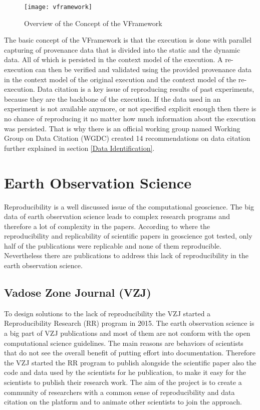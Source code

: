 \documentclass[draft,final]{vutinfth} %
\begin{document}
\begin{figure}[h]
	\centering
	\texttt{[image: vframework]}
	\caption{Overview of the Concept of the VFramework \cite{Miksa2013FrameworkFV}}
	\label{fig:vframework} %
\end{figure}

The basic concept of the VFramework is that the execution is done with parallel capturing of provenance data that is divided into the static and the dynamic data. All of which is persisted in the context model of the execution. A re-execution can then be verified and validated using the provided provenance data in the context model of the original execution and the context model of the re-execution.\cite{Miksa2013FrameworkFV}
Data citation is a key issue of reproducing results of past experiments, because they are the backbone of the execution. If the data used in an experiment is not available anymore, or not specified explicit enough then there is no chance of reproducing it no matter how much information about the execution was persisted. 
That is why there is an official working group named Working Group on Data Citation (WGDC) created 14 recommendations on data citation further explained in section \ref{Data Identification}.

\section{Earth Observation Science}\label{EOScience}

Reproducibility is a well discussed issue of the computational geoscience. The big data of earth observation science leads to complex research programs and therefore a lot of complexity in the papers.  According to \cite{Ostermann2017AdvancingSW} where the reproducibility and replicability of scientific papers in geoscience got tested, only half of the publications were replicable and none of them reproducible. Nevertheless there are publications to address this lack of reproducibility in the earth observation science. 

\subsection{Vadose Zone Journal (VZJ)}\label{VZJ}
To design solutions to the lack of reproducibility the VZJ started a Reproducibility Research (RR) program in 2015. \cite{doi:10.2136/vzj2015.06.0088}
The earth observation science is a big part of VZJ publications and most of them are not conform with the open computational science guidelines. The main reasons are behaviors of scientists that do not see the overall benefit of putting effort into documentation. Therefore the VZJ started the RR program to publish alongside the scientific paper also the code and data used by the scientists for he publication, to make it easy for the scientists to publish their research work. The aim of the project is to create a community of researchers with a common sense of reproducibility and data citation on the platform and to animate other scientists to join the approach. \cite{doi:10.2136/vzj2015.06.0088}
\end{document}
